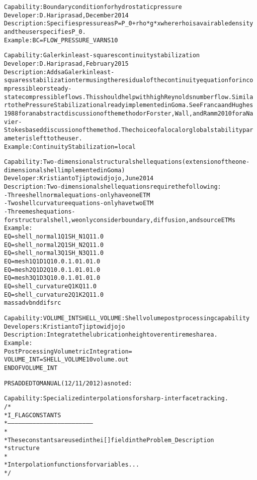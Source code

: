 \documentclass{article}
\begin{document}
\begin{alltt}
Capability: Boundary condition for hydrostatic pressure
Developer: D. Hariprasad, December 2014
Description: Specifies pressure as P = P_0 + rho*g*x where rho is a vairable density and the user specifies P_0.
Example:  BC = FLOW_PRESSURE_VAR NS 1 0

Capability: Galerkin least-squares continuity stabilization 
Developer: D. Hariprasad, February 2015
Description: Adds a Galerkin least-squares stabilization term using the residual of the continuity equation for incompressible or steady-state compressible flows.  This should help with high Reynolds number flow.  Similar to the Pressure Stabilization already implemented in Goma.  See Franca and Hughes 1988 for an abstract discussion of the method or Forster, Wall, and Ramm 2010 for a Navier-Stokes based discussion of the method.  The choice of a local or global stability parameter is left to the user.
Example: Continuity Stabilization = local


Capability:  Two-dimensional structural shell equations (extension of the one-dimensional shell implemented in Goma)
Developer: Kristianto Tjiptowidjojo, June 2014
Description:  Two-dimensional shell equations require the following: 
             - Three shell normal equations - only have one ETM
             - Two shell curvature equations - only have two ETM
             - Three mesh equations - for structural shell, we only consider boundary, diffusion, and source ETMs 
Example: 
EQ = shell_normal1    Q1  SH_N1 Q1                1.0
EQ = shell_normal2    Q1  SH_N2 Q1                1.0
EQ = shell_normal3    Q1  SH_N3 Q1                1.0
EQ = mesh1            Q1  D1    Q1  0.   0.  1.0  1.0  1.0
EQ = mesh2            Q1  D2    Q1  0.   0.  1.0  1.0  1.0
EQ = mesh3            Q1  D3    Q1  0.   0.  1.0  1.0  1.0
EQ = shell_curvature  Q1  K     Q1                1.0
EQ = shell_curvature2 Q1  K2    Q1                1.0
                                    mass adv bnd  dif  src

Capability: VOLUME_INT SHELL_VOLUME: Shell volume post processing capability 
Developers: Kristianto Tjiptowidjojo
Description:  Integrate the lubrication height over entire mesh area.  
Example: 
Post Processing Volumetric Integration =
VOLUME_INT = SHELL_VOLUME 1 0 volume.out
END OF VOLUME_INT


PRS ADDED TO MANUAL (12/11/2012) as noted:

Capability:  Specialized interpolations for sharp-interface tracking. 
/*
 * I_FLAG CONSTANTS
 * ------------------------------------------------------------------------
 *
 * These constants are used in the i[] field in the Problem_Description
 * structure
 *
 * Interpolation functions for variables...
 */


\end{alltt}
\end{document}
